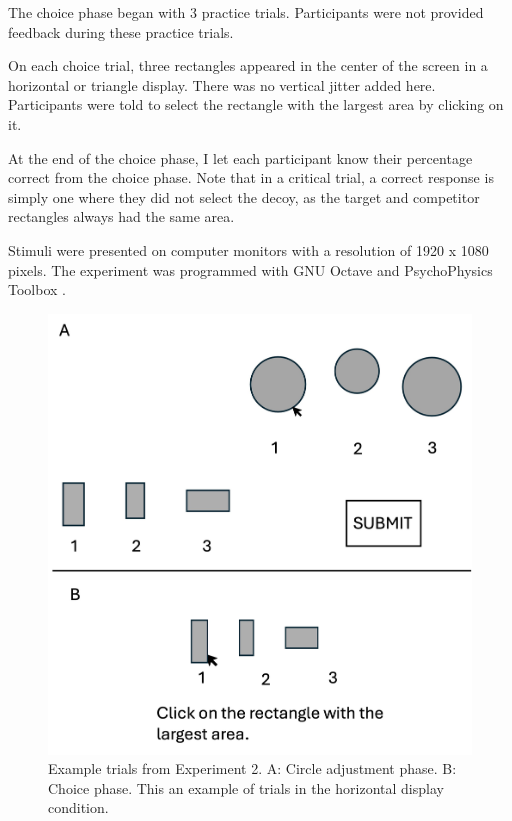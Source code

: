 The choice phase began with 3 practice trials. Participants were not provided feedback during these practice trials. 

On each choice trial, three rectangles appeared in the center of the screen in a horizontal or triangle display. There was no vertical jitter added here. Participants were told to select the rectangle with the largest area by clicking on it.

At the end of the choice phase, I let each participant know their percentage correct from the choice phase. Note that in a critical trial, a correct response is simply one where they did not select the decoy, as the target and competitor rectangles always had the same area.

Stimuli were presented on computer monitors with a resolution of 1920 x 1080 pixels. The experiment was programmed with GNU Octave \parencite{octave} and PsychoPhysics Toolbox \parencite{brainardPsychophysicsToolbox1997}. 

\begin{figure}
   \includegraphics[width=\linewidth]{figures/circle_exp_display.jpg}
   \caption{Example trials from Experiment 2. A: Circle adjustment phase. B: Choice phase. This an example of trials in the horizontal display condition.}
   \label{fig:circle_exp_display}
\end{figure}

